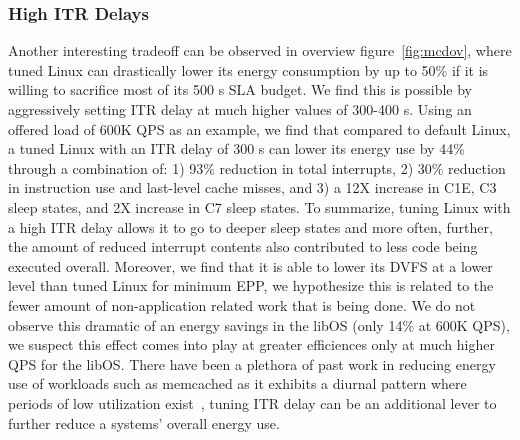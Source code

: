 \subsubsection{High ITR Delays}
Another interesting tradeoff can be observed in overview figure~\ref{fig:mcdov}, where tuned Linux can drastically lower its energy consumption by up to 50\% if it is willing to sacrifice most of its 500 \micro s SLA budget. We find this is possible by aggressively setting ITR delay at much higher values of 300-400 \micro s. Using an offered load of 600K QPS as an example, we find that compared to default Linux, a tuned Linux with an ITR delay of 300 \micro s can lower its energy use by 44\% through a combination of: 1) 93\% reduction in total interrupts, 2) 30\% reduction in instruction use and last-level cache misses, and 3) a 12X increase in C1E, C3 sleep states, and 2X increase in C7 sleep states. To summarize, tuning Linux with a high ITR delay allows it to go to deeper sleep states and more often, further, the amount of reduced interrupt contents also contributed to less code being executed overall. Moreover, we find that it is able to lower its DVFS at a lower level than tuned Linux for minimum EPP, we hypothesize this is related to the fewer amount of non-application related work that is being done. We do not observe this dramatic of an energy savings in the libOS (only 14\% at 600K QPS), we suspect this effect comes into play at greater efficiences only at much higher QPS for the libOS. There have been a plethora of past work in reducing energy use of workloads such as memcached as it exhibits a diurnal pattern where periods of low utilization exist~\cite{workloadanalysisfacebook, 10.1145/2024723.2000103,10.1145/2678373.2665718, 10.1145/2806777.2806848}, tuning ITR delay can be an additional lever to further reduce a systems' overall energy use. 

